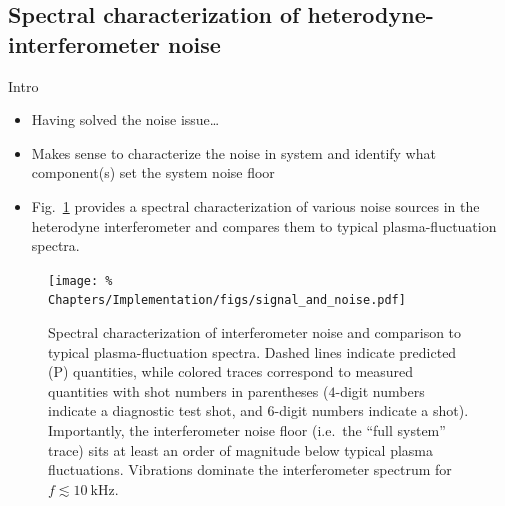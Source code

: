 \subsection{Spectral characterization of heterodyne-interferometer noise}
\label{sec:Implementation:Noise:interferometer}
Intro
\begin{itemize}
  \item Having solved the noise issue\ldots
  \item Makes sense to characterize the noise in system
    and identify what component(s) set the system noise floor
  \item Fig.~\ref{fig:Implementation:signal_and_noise}
    provides a spectral characterization of various noise sources
    in the heterodyne interferometer and
    compares them to typical plasma-fluctuation spectra.
\end{itemize}

\begin{figure}
  \centering
  \texttt{[image: \%
    Chapters/Implementation/figs/signal\_and\_noise.pdf]}
  \caption[Spectral characterization of interferometer noise]{%
    Spectral characterization of interferometer noise and
    comparison to typical plasma-fluctuation spectra.
    Dashed lines indicate predicted (P) quantities, while
    colored traces correspond to measured quantities
    with shot numbers in parentheses
    ($4$-digit numbers indicate a diagnostic test shot, and
    $6$-digit numbers indicate a \diiid\space shot).
    Importantly, the interferometer noise floor
    (i.e.\ the ``full system'' trace)
    sits at least an order of magnitude below
    typical plasma fluctuations.
    Vibrations dominate the interferometer spectrum
    for $f \lesssim \SI{10}{\kilo\hertz}$.
  }
\label{fig:Implementation:signal_and_noise}
\end{figure}

